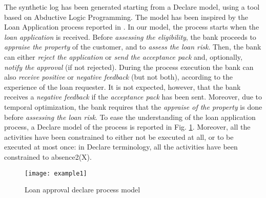 The synthetic log has been generated starting from a Declare model, using a tool \cite{2020-Loreti} based on Abductive Logic Programming. The model has been inspired by the Loan Application process reported in \cite{DBLP:books/sp/DumasRMR18}. In our model, the process starts when the \emph{loan application} is received. Before \emph{assessing the eligibility}, the bank proceeds to \emph{appraise the property} of the customer, and to \emph{assess the loan risk}. Then, the bank can either \emph{reject the application} or \emph{send the acceptance pack} and, optionally, \emph{notify the approval} (if not rejected). During the process execution the bank can also \emph{receive positive} or \emph{negative feedback} (but not both), according to the experience of the loan requester. It is not expected, however, that the bank receives a \emph{negative feedback} if the \emph{acceptance pack} has been sent. Moreover, due to temporal optimization, the bank requires that the \emph{appraise of the property} is done before \emph{assessing the loan risk}.
To ease the understanding of the loan application process, a Declare model of the process is reported in Fig. \ref{fig:ex}. Moreover, all the activities have been constrained to either not be executed at all, or to be executed at most once: in Declare terminology, all the activities have been constrained to \textsf{absence2(X)}.

\begin{figure}[t]
\centering
\texttt{[image: example1]}
\caption{Loan approval declare process model }
\label{fig:ex}
\end{figure}

